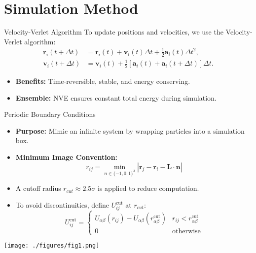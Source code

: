 \documentclass{beamer}
\begin{document}
\section{Simulation Method}
\begin{frame}{Velocity-Verlet Algorithm}
  To update positions and velocities, we use the Velocity-Verlet algorithm:
  \begin{align}
    \mathbf{r}_i(t+\Delta t) &= \mathbf{r}_i(t) + \mathbf{v}_i(t)\Delta t + \frac{1}{2} \mathbf{a}_i(t)\Delta t^2, \label{eq:verlet1} \\
    \mathbf{v}_i(t+\Delta t) &= \mathbf{v}_i(t) + \frac{1}{2}\left[\mathbf{a}_i(t) + \mathbf{a}_i(t+\Delta t)\right]\Delta t. \label{eq:verlet2}
  \end{align}
  \vspace{0.5em}
  \begin{itemize}
    \item \textbf{Benefits:} Time-reversible, stable, and energy conserving.
    \item \textbf{Ensemble:} NVE ensures constant total energy during simulation.
  \end{itemize}
\end{frame}

\begin{frame}{Periodic Boundary Conditions}
  \begin{multicols}{2}
  \begin{itemize}
    \item \textbf{Purpose:} Mimic an infinite system by wrapping particles into a simulation box.
    \item \textbf{Minimum Image Convention:}
      \[
      r_{ij} = \min_{n \in \{-1,0,1\}^3} \left| \mathbf{r}_j - \mathbf{r}_i - \mathbf{L}\cdot\mathbf{n} \right|
      \]
    \item A cutoff radius \(r_{cut} \approx 2.5\sigma\) is applied to reduce computation.
    \item To avoid discontinuities, define \(U^{\text{cut}}_{ij}\) at \(r_{cut}\): 
    \vspace{0.2cm}
    \begin{equation*}
      U_{ij}^{\text{cut}} = 
      \begin{cases}
          U_{\alpha\beta}(r_{ij}) - U_{\alpha\beta}(r_{\alpha\beta}^{\text{cut}}) & r_{ij} < r_{\alpha\beta}^\text{cut} \\
          0 & \text{otherwise}
      \end{cases}
    \end{equation*}
  \end{itemize}
  \columnbreak
  \texttt{[image: ./figures/fig1.png]} %
  \end{multicols}
\end{frame}
\end{document}
